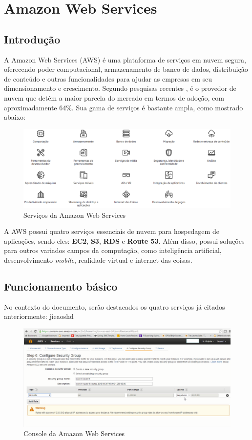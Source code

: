 \chapter{Amazon Web Services}

\section{Introdução}
A Amazon Web Services (AWS) é uma plataforma de serviços em nuvem segura, oferecendo poder computacional, armazenamento de banco de dados, distribuição de conteúdo e outras funcionalidades para ajudar as empresas em seu dimensionamento e crescimento. Segundo pesquisas recentes \cite{rightscale}, é o provedor de nuvem que detém a maior parcela do mercado em termos de adoção, com aproximadamente 64\%. Sua gama de serviços é bastante ampla, como mostrado abaixo:

\begin{figure}[h!]
  \centering
  \includegraphics[scale=0.38]{imagens/aws-services.eps}
  \caption{Serviços da Amazon Web Services\cite{aws-services}}
\end{figure}

A AWS possui quatro serviços essenciais de nuvem para hospedagem de aplicações, sendo eles: \textbf{EC2}, \textbf{S3}, \textbf{RDS} e \textbf{Route 53}. Além disso, possui soluções para outros variados campos da computação, como inteligência artificial, desenvolvimento \textit{mobile}, realidade virtual e internet das coisas.


\section{Funcionamento básico}
No contexto do documento, serão destacados os quatro serviços já citados anteriormente:
jieaoshd

\begin{figure}[h!]
  \centering
  \includegraphics[scale=0.42]{imagens/aws-console.eps}
  \caption{Console da Amazon Web Services}
\end{figure}


